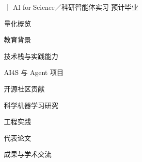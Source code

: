 \documentclass{resume}
\begin{document}
\makeaiheader
  {\UniversityName｜\SchoolName}
  {AI for Science／科研智能体实习}
  {\CandidateContacts}
  {预计毕业 \ExpectedGraduation}
  {\Availability}
  {}
  {\qquad
   }
  {}
\begin{rSectionWithTags}{量化概览}{\enspace{}\enspace{}\enspace{}}
\ExampleStats
\end{rSectionWithTags}
\begin{rSection}{教育背景}
\ExampleEducation
\end{rSection}
\begin{rSection}{技术栈与实践能力}
\ExampleSkills
\end{rSection}
\begin{rSection}{AI4S 与 Agent 项目}
\AssistantProject
\WorkflowProject
\end{rSection}
\newpage
\begin{rSectionWithTags}{开源社区贡献}{}
\ExampleContributions
\end{rSectionWithTags}
\begin{rSection}{科学机器学习研究}
\HeatProject
\UncertaintyProject
\end{rSection}
\begin{rSection}{工程实践}
\ExamplePractice
\end{rSection}
\begin{rSection}{代表论文}
\ExamplePublications
\end{rSection}
\begin{rSection}{成果与学术交流}
\ExampleAwards
\end{rSection}
\end{document}

